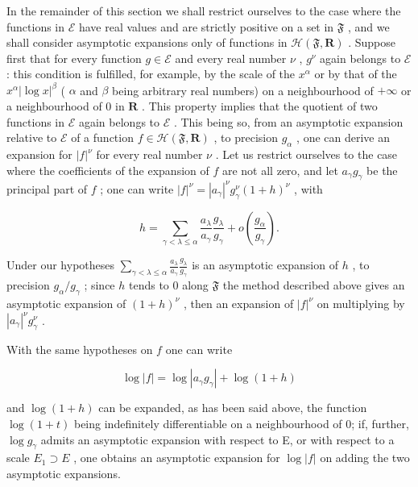 In the remainder of this section we shall restrict ourselves to the case where the functions in \(\mathcal{E}\) have real values and are strictly positive on a set in \(\mathfrak{F}\) , and we shall consider asymptotic expansions only of functions in \(\mathcal{H}(\mathfrak{F},\mathbf{R})\) . Suppose first that for every function \(g\in \mathcal{E}\) and every real number \(\nu\) , \(g^{\nu}\) again belongs to \(\mathcal{E}\) : this condition is fulfilled, for example, by the scale of the \(x^{\alpha}\) or by that of the \(x^{\alpha}|\log x|^{\beta}\) ( \(\alpha\) and \(\beta\) being arbitrary real numbers) on a neighbourhood of \(+\infty\) or a neighbourhood of 0 in \(\mathbf{R}\) . This property implies that the quotient of two functions in \(\mathcal{E}\) again belongs to \(\mathcal{E}\) . This being so, from an asymptotic expansion relative to \(\mathcal{E}\) of a function \(f\in \mathcal{H}(\mathfrak{F},\mathbf{R})\) , to precision \(g_{\alpha}\) , one can derive an expansion for \(|f|^{\nu}\) for every real number \(\nu\) . Let us restrict ourselves to the case where the coefficients of the expansion of \(f\) are not all zero, and let \(a_{\gamma}g_{\gamma}\) be the principal part of \(f\) ; one can write \(|f|^{\nu} = |a_{\gamma}|^{\nu}g_{\gamma}^{\nu}(1 + h)^{\nu}\) , with

\[
h = \sum_ {\gamma <   \lambda \leqslant \alpha} \frac {a _ {\lambda}}{a _ {\gamma}} \frac {g _ {\lambda}}{g _ {\gamma}} + o \left(\frac {g _ {\alpha}}{g _ {\gamma}}\right).
\]

Under our hypotheses \(\sum_{\gamma < \lambda \leqslant \alpha} \frac{a_{\lambda}}{a_{\gamma}} \frac{g_{\lambda}}{g_{\gamma}}\) is an asymptotic expansion of \(h\) , to precision \(g_{\alpha} / g_{\gamma}\) ; since \(h\) tends to 0 along \(\mathfrak{F}\) the method described above gives an asymptotic expansion of \((1 + h)^{\nu}\) , then an expansion of \(|f|^{\nu}\) on multiplying by \(\left|a_{\gamma}\right|^{\nu} g_{\gamma}^{\nu}\) .

With the same hypotheses on \(f\) one can write

\[
\log | f | = \log \left| a _ {\gamma} g _ {\gamma} \right| + \log (1 + h)
\]

and \(\log(1+h)\) can be expanded, as has been said above, the function \(\log(1+t)\) being indefinitely differentiable on a neighbourhood of 0; if, further, \(\log g_{\gamma}\) admits an asymptotic expansion with respect to E, or with respect to a scale \(E_{1} \supset E\) , one obtains an asymptotic expansion for \(\log|f|\) on adding the two asymptotic expansions.

